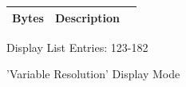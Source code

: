 \hspace{0.1cm}
\begin{minipage}[b]{0.31\linewidth}
  \begin{figure}[H]
    {
      \setlength{\tabcolsep}{3.0pt}
      \setlength\cmidrulewidth{\heavyrulewidth} %
      \begin{adjustbox}{height=8.5cm}

        \begin{tabular}{lll}
          \toprule
          Bytes       & Description                                                         \\
          \midrule
        \end{tabular}

      \end{adjustbox}

    }\caption*{Display List Entries: 123-182}
  \end{figure}
\end{minipage}

\clearpage
\begin{figure}[H]
    \centering
    \begin{adjustbox}{width=12cm,center}
    \end{adjustbox}
\caption{'Variable Resolution' Display Mode}
\end{figure}


